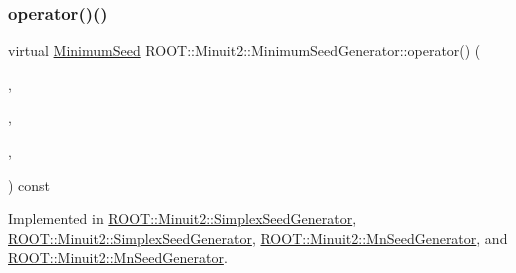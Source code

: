 \subsubsection{\texorpdfstring{operator()()}{operator()()}\hspace{0.1cm}{\footnotesize\ttfamily [3/4]}}
{\footnotesize\ttfamily virtual \mbox{\hyperlink{classROOT_1_1Minuit2_1_1MinimumSeed}{Minimum\+Seed}} R\+O\+O\+T\+::\+Minuit2\+::\+Minimum\+Seed\+Generator\+::operator() (\begin{DoxyParamCaption}\item[{const \mbox{\hyperlink{classROOT_1_1Minuit2_1_1MnFcn}{Mn\+Fcn}} \&}]{,  }\item[{const \mbox{\hyperlink{classROOT_1_1Minuit2_1_1AnalyticalGradientCalculator}{Analytical\+Gradient\+Calculator}} \&}]{,  }\item[{const \mbox{\hyperlink{classROOT_1_1Minuit2_1_1MnUserParameterState}{Mn\+User\+Parameter\+State}} \&}]{,  }\item[{const \mbox{\hyperlink{classROOT_1_1Minuit2_1_1MnStrategy}{Mn\+Strategy}} \&}]{ }\end{DoxyParamCaption}) const\hspace{0.3cm}{\ttfamily [pure virtual]}}



Implemented in \mbox{\hyperlink{classROOT_1_1Minuit2_1_1SimplexSeedGenerator_abce591c5a1e1aa0882dd5b474530efce}{R\+O\+O\+T\+::\+Minuit2\+::\+Simplex\+Seed\+Generator}}, \mbox{\hyperlink{classROOT_1_1Minuit2_1_1SimplexSeedGenerator_a483dc9272be849a23bcd0d29ac4e3b94}{R\+O\+O\+T\+::\+Minuit2\+::\+Simplex\+Seed\+Generator}}, \mbox{\hyperlink{classROOT_1_1Minuit2_1_1MnSeedGenerator_a300ecb8a37b30fc5bd13c353f3338a92}{R\+O\+O\+T\+::\+Minuit2\+::\+Mn\+Seed\+Generator}}, and \mbox{\hyperlink{classROOT_1_1Minuit2_1_1MnSeedGenerator_aeba9e3b985e5d74e797cafaffec74de3}{R\+O\+O\+T\+::\+Minuit2\+::\+Mn\+Seed\+Generator}}.

\mbox{\label{classROOT_1_1Minuit2_1_1MinimumSeedGenerator_a670b9671c73d7e0d3caa148e82d4b2fa}} 
